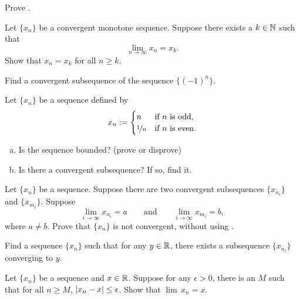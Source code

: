 \begin{exercise}
Prove .
\end{exercise}

\begin{exercise}
Let $\{ x_n \}$ be a convergent monotone sequence.  Suppose 
there exists a $k \in {\mathbb{N}}$ such that
\begin{equation*}
\lim_{n\to \infty} x_n = x_k .
\end{equation*}
Show that $x_n = x_k$ for all $n \geq k$.
\end{exercise}

\begin{exercise}
Find a convergent subsequence of the sequence
$\{ {(-1)}^n \}$.
\end{exercise}

\begin{exercise}
Let $\{x_n\}$ be a sequence defined by
\begin{equation*}
x_n := 
\begin{cases}
n               & \text{if } n \text{ is odd} , \\
\nicefrac{1}{n} & \text{if } n \text{ is even} .
\end{cases}
\end{equation*}
\begin{enumerate}[a)]
\item Is the sequence bounded? (prove or disprove)
\item Is there a convergent subsequence?  If so, find it.
\end{enumerate}
\end{exercise}

\begin{exercise}
Let $\{ x_n \}$ be a sequence.
Suppose there are two convergent subsequences $\{ x_{n_i} \}$ and
$\{ x_{m_i} \}$.  Suppose 
\begin{equation*}
\lim_{i\to\infty} x_{n_i} = a
\qquad \text{and} \qquad
\lim_{i\to\infty} x_{m_i} = b,
\end{equation*}
where $a \not= b$.  Prove that $\{ x_n \}$ is not convergent, without
using .
\end{exercise}

\begin{exercise}[Tricky]
Find a sequence $\{ x_n \}$ such that for any $y \in {\mathbb{R}}$, there exists a
subsequence $\{ x_{n_i} \}$ converging to $y$.
\end{exercise}

\begin{exercise}[Easy]
Let $\{ x_n \}$ be a sequence and $x \in {\mathbb{R}}$.
Suppose for any $\epsilon > 0$, there is an $M$ such that for
all $n \geq M$, $\left\lvert {x_n-x} \right\rvert \leq \epsilon$.  Show that $\lim\, x_n = x$.
\end{exercise}

